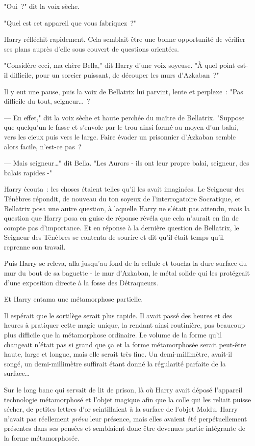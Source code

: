 "Oui~?" dit la voix sèche.

"Quel est cet appareil que vous fabriquez~?"

Harry réfléchit rapidement. Cela semblait être une bonne opportunité de vérifier ses plans auprès d'elle sous couvert de questions orientées.

"Considère ceci, ma chère Bella," dit Harry d'une voix soyeuse. "À quel point est-il difficile, pour un sorcier puissant, de découper les murs d'Azkaban~?"

Il y eut une pause, puis la voix de Bellatrix lui parvint, lente et perplexe~: "Pas difficile du tout, seigneur…~?

--- En effet," dit la voix sèche et haute perchée du maître de Bellatrix. "Suppose que quelqu'un le fasse et s'envole par le trou ainsi formé au moyen d'un balai, vers les cieux puis vers le large. Faire évader un prisonnier d'Azkaban semble alors facile, n'est-ce pas~?

--- Mais seigneur…" dit Bella. "Les Aurors - ils ont leur propre balai, seigneur, des balais rapides -"

Harry écouta~: les choses étaient telles qu'il les avait imaginées. Le Seigneur des Ténèbres répondit, de nouveau du ton soyeux de l'interrogatoire Socratique, et Bellatrix posa une autre question, à laquelle Harry ne s'était pas attendu, mais la question que Harry posa en guise de réponse révéla que cela n'aurait en fin de compte pas d'importance. Et en réponse à la dernière question de Bellatrix, le Seigneur des Ténèbres se contenta de sourire et dit qu'il était temps qu'il reprenne son travail.

Puis Harry se releva, alla jusqu'au fond de la cellule et toucha la dure surface du mur du bout de sa baguette - le mur d'Azkaban, le métal solide qui les protégeait d'une exposition directe à la fosse des Détraqueurs.

Et Harry entama une métamorphose partielle.

Il espérait que le sortilège serait plus rapide. Il avait passé des heures et des heures à pratiquer cette magie unique, la rendant ainsi routinière, pas beaucoup plus difficile que la métamorphose ordinaire. Le volume de la forme qu'il changeait n'était pas si grand que ça et la forme métamorphosée serait peut-être haute, large et longue, mais elle serait très fine. Un demi-millimètre, avait-il songé, un demi-millimètre suffirait étant donné la régularité parfaite de la surface…

Sur le long banc qui servait de lit de prison, là où Harry avait déposé l'appareil technologie métamorphosé et l'objet magique afin que la colle qui les reliait puisse sécher, de petites lettres d'or scintillaient à la surface de l'objet Moldu. Harry n'avait pas réellement \emph{prévu} leur présence, mais elles avaient été perpétuellement présentes dans ses pensées et semblaient donc être devenues partie intégrante de la forme métamorphosée.

